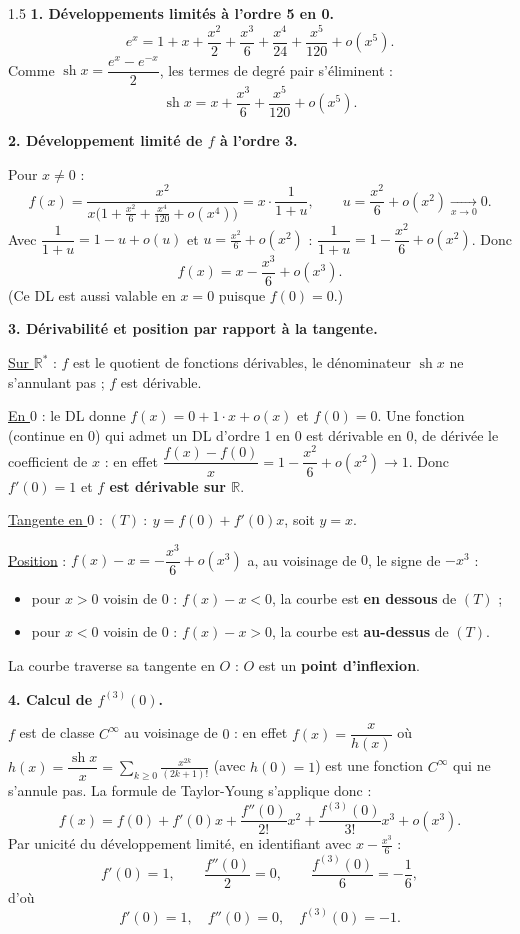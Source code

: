 \documentclass[12pt]{article}
\begin{document}
\begin{spacing}{1.5}
\textbf{1. Développements limités à l'ordre 5 en 0.}
\[
e^x=1+x+\frac{x^2}{2}+\frac{x^3}{6}+\frac{x^4}{24}+\frac{x^5}{120}+o(x^5).
\]
Comme $\operatorname{sh}x=\dfrac{e^x-e^{-x}}{2}$, les termes de degré pair s'éliminent :
\[
\operatorname{sh}x=x+\frac{x^3}{6}+\frac{x^5}{120}+o(x^5).
\]

\textbf{2. Développement limité de $f$ à l'ordre 3.}

Pour $x\neq0$ :
\[
f(x)=\frac{x^2}{x\big(1+\frac{x^2}{6}+\frac{x^4}{120}+o(x^4)\big)}=x\cdot\frac{1}{1+u},\qquad u=\frac{x^2}{6}+o(x^2)\xrightarrow[x\to0]{}0 .
\]
Avec $\dfrac1{1+u}=1-u+o(u)$ et $u=\frac{x^2}{6}+o(x^2)$ : $\dfrac1{1+u}=1-\dfrac{x^2}{6}+o(x^2)$. Donc
\[
\boxed{f(x)=x-\frac{x^3}{6}+o(x^3)}.
\]
(Ce DL est aussi valable en $x=0$ puisque $f(0)=0$.)

\textbf{3. Dérivabilité et position par rapport à la tangente.}

\underline{Sur $\mathbb{R}^*$} : $f$ est le quotient de fonctions dérivables, le dénominateur $\operatorname{sh}x$ ne s'annulant pas ; $f$ est dérivable.

\underline{En $0$} : le DL donne $f(x)=0+1\cdot x+o(x)$ et $f(0)=0$. Une fonction (continue en $0$) qui admet un DL d'ordre 1 en $0$ est dérivable en $0$, de dérivée le coefficient de $x$ : en effet $\dfrac{f(x)-f(0)}{x}=1-\dfrac{x^2}{6}+o(x^2)\to1$. Donc $f'(0)=1$ et \textbf{$f$ est dérivable sur $\mathbb{R}$}.

\underline{Tangente en $0$} : $(T)\ :\ y=f(0)+f'(0)x$, soit $y=x$.

\underline{Position} : $f(x)-x=-\dfrac{x^3}{6}+o(x^3)$ a, au voisinage de $0$, le signe de $-x^3$ :
\begin{itemize}
\item pour $x>0$ voisin de $0$ : $f(x)-x<0$, la courbe est \textbf{en dessous} de $(T)$ ;
\item pour $x<0$ voisin de $0$ : $f(x)-x>0$, la courbe est \textbf{au-dessus} de $(T)$.
\end{itemize}
La courbe traverse sa tangente en $O$ : $O$ est un \textbf{point d'inflexion}.

\textbf{4. Calcul de $f^{(3)}(0)$.}

$f$ est de classe $C^\infty$ au voisinage de $0$ : en effet $f(x)=\dfrac{x}{h(x)}$ où $h(x)=\dfrac{\operatorname{sh}x}{x}=\displaystyle\sum_{k\ge0}\frac{x^{2k}}{(2k+1)!}$ (avec $h(0)=1$) est une fonction $C^\infty$ qui ne s'annule pas. La formule de Taylor-Young s'applique donc :
\[
f(x)=f(0)+f'(0)x+\frac{f''(0)}{2!}x^2+\frac{f^{(3)}(0)}{3!}x^3+o(x^3).
\]
Par unicité du développement limité, en identifiant avec $x-\frac{x^3}{6}$ :
\[
f'(0)=1,\qquad\frac{f''(0)}{2}=0,\qquad\frac{f^{(3)}(0)}{6}=-\frac16,
\]
d'où
\[
\boxed{f'(0)=1,\quad f''(0)=0,\quad f^{(3)}(0)=-1}.
\]


\end{spacing}
\end{document}
